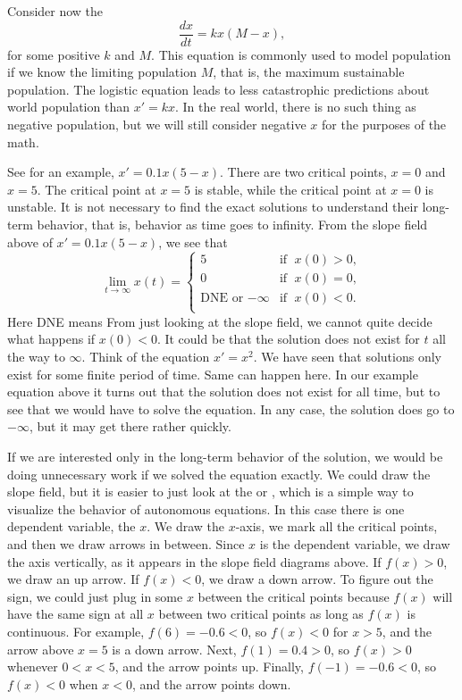 \medskip

Consider now the \emph{}
\begin{equation*}
\frac{dx}{dt} = kx(M-x) ,
\end{equation*}
for some positive $k$ and $M$.  This equation is commonly used to model
population if we know the limiting population $M$, that is, the maximum
sustainable population.  The logistic equation leads to
less catastrophic
predictions about world population than $x'=kx$.  In the real world, there is no
such thing as negative population, but we will still consider negative $x$ for
the purposes of the math.

See  for an example, $x' = 0.1 x(5-x)$.
There are two critical points, $x=0$ and $x=5$.  The critical point
at $x=5$ is stable, while the critical point at $x=0$ is
unstable.
It is not necessary to find the exact solutions to understand their
long-term behavior, that is, behavior as time goes to infinity.
From the slope field above of
$x' = 0.1 x(5-x)$, we see that
\begin{equation*}
\lim_{t\to \infty} x(t) =
\begin{cases}
5 & \text{if } \; x(0) > 0 , \\
0 & \text{if } \; x(0) = 0 , \\
\text{DNE or } {-\infty} & \text{if } \; x(0) < 0 . \\
\end{cases}
\end{equation*}
Here DNE means   From just looking at the slope
field, we
cannot quite decide what happens if $x(0) < 0$.  It could be that the
solution does not exist for $t$ all the way to $\infty$.
Think of the equation $x' = x^2$.
We have seen that solutions only exist for some finite period of time.
Same can happen
here.  In our example equation above it turns out that the
solution does not exist for all time, but to see that we would have to solve
the equation.  In any case, the solution does go to $-\infty$, but it may get
there rather quickly.


If we are interested only in the long-term behavior of the solution,
we would be doing unnecessary work if we solved the
equation exactly.
We could draw the slope field, but
it is easier to just look at the \emph{} or
\emph{}, which is a simple
way to visualize the behavior of
autonomous equations.  In this case there is one dependent variable, the $x$.
We draw the $x$-axis, we mark all the critical points,
and then we draw arrows in
between.  Since $x$ is the dependent variable, we draw the axis vertically,
as it appears in the slope field diagrams above.
If $f(x) > 0$, we draw an up arrow.  If $f(x) < 0$, we draw
a down arrow.
To figure out the sign, we could just plug in some $x$ between the critical
points because $f(x)$ will have the same sign at all $x$ between two critical
points as long as $f(x)$ is continuous.
For example, $f(6) = -0.6 < 0$, so $f(x) < 0$ for $x > 5$,
and the arrow above $x=5$ is a down
arrow.  Next, $f(1) = 0.4 > 0$, so $f(x) > 0$ whenever $0 < x < 5$, and
the arrow points up.  Finally, $f(-1) = -0.6 < 0$, so $f(x) < 0$ when $x <
0$, and the arrow points down.

